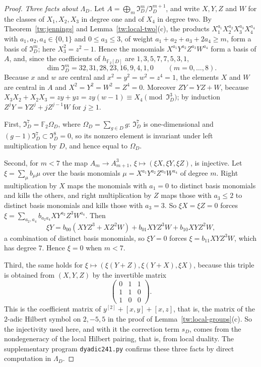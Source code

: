 \documentclass[11pt]{amsart}
\numberwithin{equation}{section}
\theoremstyle{definition}
\theoremstyle{remark}
\newcommand{\Ftwo}{\mathbb F_2}
\begin{document}
\begin{proof}
\emph{Three facts about $\Lambda_D$.} Let $A=\bigoplus_m\mathfrak I_D^m/\mathfrak I_D^{m+1}$,
and write $X,Y,Z$ and $W$ for the classes of $X_1,X_2,X_3$ in degree one and
of $X_4$ in degree two. By Theorem~\ref{tw:jennings} and
Lemma~\ref{tw:local-two}(c), the products
$X_1^{a_1}X_2^{a_2}X_3^{a_3}X_4^{a_4}$ with $a_1,a_2,a_4\in\{0,1\}$ and
$0\le a_3\le3$, of weight $a_1+a_2+a_3+2a_4\ge m$, form a basis of
$\mathfrak I_D^m$; here $X_3^2=z^2-1$. Hence the monomials
$X^{a_1}Y^{a_2}Z^{a_3}W^{a_4}$ form a basis of $A$, and, since the
coefficients of $h_{\Ftwo[D]}$ are $1,3,5,7,7,5,3,1$,
\[
 \dim\mathfrak I_D^m=32,31,28,23,16,9,4,1,0\qquad(m=0,\dots,8).
\]
Because $x$ and $w$ are central and $x^2=y^2=w^2=z^4=1$, the elements $X$
and $W$ are central in $A$ and $X^2=Y^2=W^2=Z^4=0$. Moreover $ZY=YZ+W$,
because $X_3X_2+X_2X_3=zy+yz=zy(w-1)\equiv X_4\pmod{\mathfrak I_D^3}$; by
induction $Z^jY=YZ^j+jZ^{j-1}W$ for $j\ge1$.

First, $\mathfrak I_D^7=\Ftwo\Omega_D$, where $\Omega_D=\sum_{g\in D}g$:
$\mathfrak I_D^7$ is one-dimensional and $(g-1)\mathfrak I_D^7\subset\mathfrak I_D^8=0$,
so its nonzero element is invariant under left multiplication by $D$, and
hence equal to $\Omega_D$.

Second, for $m<7$ the map $A_m\to A_{m+1}^3$, $\xi\mapsto(\xi X,\xi Y,\xi Z)$,
is injective. Let $\xi=\sum_\mu b_\mu\mu$ over the basis monomials
$\mu=X^{a_1}Y^{a_2}Z^{a_3}W^{a_4}$ of degree $m$. Right multiplication by $X$
maps the monomials with $a_1=0$ to distinct basis monomials and kills the
others, and right multiplication by $Z$ maps those with $a_3\le2$ to
distinct basis monomials and kills those with $a_3=3$. So $\xi X=\xi Z=0$
forces $\xi=\sum_{a_2,a_4}b_{a_2a_4}XY^{a_2}Z^3W^{a_4}$. Then
\[
 \xi Y=b_{00}(XYZ^3+XZ^2W)+b_{01}XYZ^3W+b_{10}XYZ^2W,
\]
a combination of distinct basis monomials, so $\xi Y=0$ forces
$\xi=b_{11}XYZ^3W$, which has degree $7$. Hence $\xi=0$ when $m<7$.

Third, the same holds for $\xi\mapsto(\xi(Y+Z),\xi(Y+X),\xi X)$, because this
triple is obtained from $(X,Y,Z)$ by the invertible matrix
\[
 \begin{pmatrix}0&1&1\\1&1&0\\1&0&0\end{pmatrix}.
\]
This is the coefficient matrix of $y^{[2]}+[x,y]+[x,z]$, that is, the matrix
of the $2$-adic Hilbert symbol on $2,-5,5$ in the proof of
Lemma~\ref{tw:local-groups}(c). So the injectivity used here, and with it
the correction term $s_D$, comes from the nondegeneracy of the local Hilbert pairing,
that is, from local duality. The supplementary program \texttt{dyadic241.py}
confirms these three facts by direct computation in $\Lambda_D$.


\end{proof}
\end{document}

